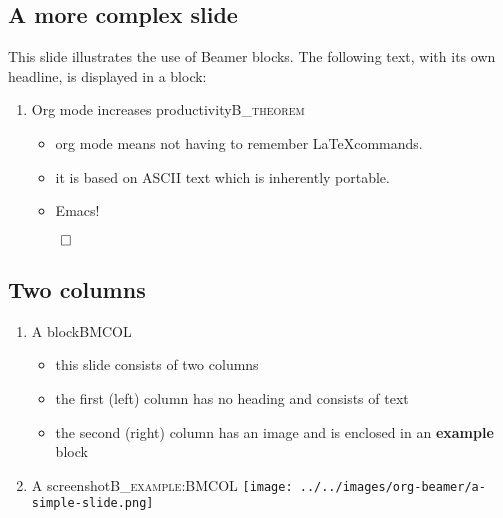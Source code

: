 \documentclass[bigger]{beamer}
\begin{document}
\subsection{A more complex slide}
\label{sec:orgheadline5}
This slide illustrates the use of Beamer blocks.  The following text,
with its own headline, is displayed in a block:
\begin{enumerate}
\item Org mode increases productivity\hfill{}\textsc{B\_theorem}
\label{sec:orgheadline4}
\begin{itemize}
\item org mode means not having to remember \LaTeX commands.
\item it is based on ASCII text which is inherently portable.
\item Emacs!
\end{itemize}

\hfill \(\qed\)
\end{enumerate}

\subsection{Two columns}
\label{sec:orgheadline8}

\begin{enumerate}
\item A block\hfill{}\textsc{BMCOL}
\label{sec:orgheadline6}
\begin{itemize}
\item this slide consists of two columns
\item the first (left) column has no heading and consists of text
\item the second (right) column has an image and is enclosed in an \textbf{example} block
\end{itemize}

\item A screenshot\hfill{}\textsc{B\_example:BMCOL}
\label{sec:orgheadline7}
\texttt{[image: ../../images/org-beamer/a-simple-slide.png]}
\end{enumerate}
\end{document}
